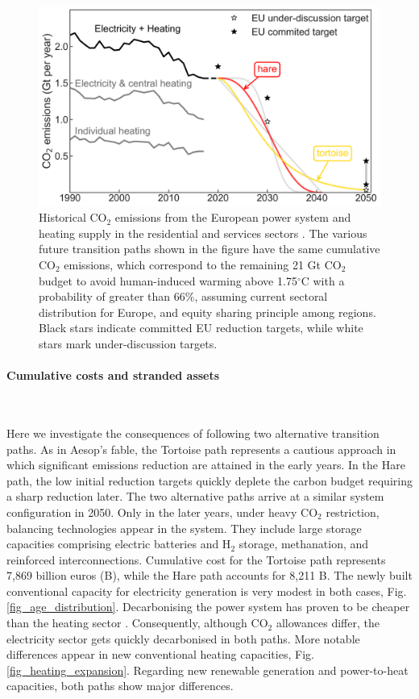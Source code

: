 \documentclass[5p]{elsarticle} %
\begin{document}
\begin{figure}[!h]
\centering
	\includegraphics[width=\columnwidth]{figures/carbon_budget.png}
\caption{Historical CO$_2$ emissions from the European power system and heating supply in the residential and services sectors \cite{UNFCCC_inventory}. The various future transition paths shown in the figure have the same cumulative CO$_2$ emissions, which correspond to the remaining 21 Gt CO$_2$ budget to avoid human-induced warming above 1.75$^{\circ}$C with a probability of greater than 66\%, assuming current sectoral distribution for Europe, and equity sharing principle among regions. Black stars indicate committed EU reduction targets, while white stars mark under-discussion targets.} \label{fig_carbon_budget} 
\end{figure}

\paragraph{\textbf{Cumulative costs and stranded assets}} \

Here we investigate the consequences of following two alternative transition paths. As in Aesop's fable, the Tortoise path represents a cautious approach in which significant emissions reduction are attained in the early years. In the Hare path, the low initial reduction targets quickly deplete the carbon budget requiring a sharp reduction later. The two alternative paths arrive at a similar system configuration in 2050. Only in the later years, under heavy CO$_2$ restriction, balancing technologies appear in the system. They include large storage capacities comprising electric batteries and H$_2$ storage, methanation, and reinforced interconnections.  Cumulative cost for the Tortoise path represents 7,869 billion euros (B\EUR), while the Hare path accounts for 8,211 B\EUR. The newly built conventional capacity for electricity generation is very modest in both cases, Fig. \ref{fig_age_distribution}. Decarbonising the power system has proven to be cheaper than the heating sector \cite{Zhu_2019}. Consequently, although CO$_2$ allowances differ, the electricity sector gets quickly decarbonised in both paths. More notable differences appear in new conventional heating capacities, Fig. \ref{fig_heating_expansion}. Regarding new renewable generation and power-to-heat capacities, both paths show major differences.
\end{document}
